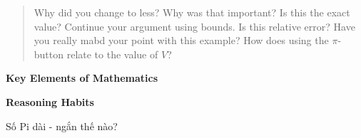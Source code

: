 {\begin{quotation}
\begin{scriptlist}
        \item[Teacher:] Why did you change to less? Why was that important? Is this the exact value? Continue your argument using bounds. Is this relative error? Have you really mabd your point with this example? How does using the $\pi$-button relate to the value of $V$?
      \end{scriptlist}
      \end{quotation}\vspace{5.5\baselineskip}

    \textbf{Key Elements of Mathematics}

    \begin{hanglist}
    \end{hanglist}

    \textbf{Reasoning Habits}

    \begin{hanglist}


    \end{hanglist}
  }
  {Số Pi dài - ngắn thế nào?}
